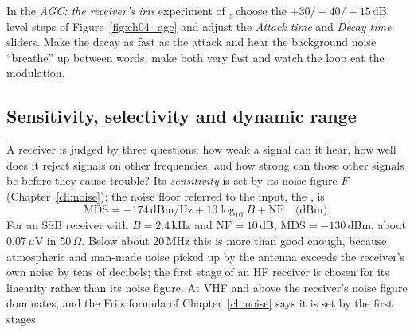 \begin{tryit}
In the \emph{AGC: the receiver's iris} experiment of , choose the
$+30/-40/+15$\,dB level steps of Figure~\ref{fig:ch04_agc} and adjust the \emph{Attack time} and \emph{Decay
time} sliders. Make the decay as fast as the attack and
hear the background noise ``breathe'' up between words; make both very fast and watch the loop eat the
modulation.
\end{tryit}

\subsection{Sensitivity, selectivity and dynamic range}
\label{sec:ch04:dynrange}

A receiver is judged by three questions: how weak a signal can it hear, how well does it reject signals on
other frequencies, and how strong can those other signals be before they cause trouble? Its
\emph{sensitivity} is set by its noise figure $F$ (Chapter~\ref{ch:noise}): the noise floor referred to the
input, the , is
\begin{equation}
\text{MDS}=-174\,\text{dBm/Hz}+10\log_{10}B+\text{NF}\quad\text{(dBm)}.
\label{eq:ch04:mds}
\end{equation}
For an SSB receiver with $B=2.4$\,kHz and $\text{NF}=10$\,dB, $\text{MDS}=-130$\,dBm, about 0.07\,$\mu$V in
50\,$\Omega$. Below about 20\,MHz this is more than good enough, because atmospheric and man-made noise picked
up by the antenna exceeds the receiver's own noise by tens of decibels; the first stage of an HF receiver is
chosen for its linearity rather than its noise figure. At VHF and above the receiver's noise figure dominates,
and the Friis formula of Chapter~\ref{ch:noise} says it is set by the first stages.

